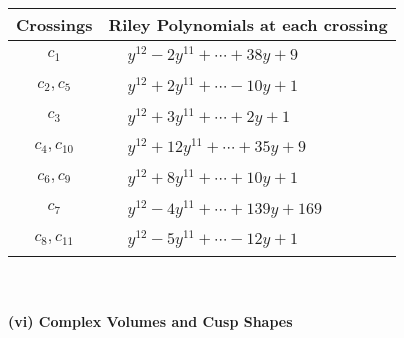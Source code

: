\documentclass[1p]{elsarticle_modified}
\theoremstyle{definition}
\begin{document}
\begin{tabular}{m{50pt}|m{274pt}}
Crossings & \hspace{64pt}Riley Polynomials at each crossing \\
\hline $$\begin{aligned}c_{1}\end{aligned}$$&$\begin{aligned}
&y^{12}-2 y^{11}+\cdots+38 y+9
\end{aligned}$\\
\hline $$\begin{aligned}c_{2},c_{5}\end{aligned}$$&$\begin{aligned}
&y^{12}+2 y^{11}+\cdots-10 y+1
\end{aligned}$\\
\hline $$\begin{aligned}c_{3}\end{aligned}$$&$\begin{aligned}
&y^{12}+3 y^{11}+\cdots+2 y+1
\end{aligned}$\\
\hline $$\begin{aligned}c_{4},c_{10}\end{aligned}$$&$\begin{aligned}
&y^{12}+12 y^{11}+\cdots+35 y+9
\end{aligned}$\\
\hline $$\begin{aligned}c_{6},c_{9}\end{aligned}$$&$\begin{aligned}
&y^{12}+8 y^{11}+\cdots+10 y+1
\end{aligned}$\\
\hline $$\begin{aligned}c_{7}\end{aligned}$$&$\begin{aligned}
&y^{12}-4 y^{11}+\cdots+139 y+169
\end{aligned}$\\
\hline $$\begin{aligned}c_{8},c_{11}\end{aligned}$$&$\begin{aligned}
&y^{12}-5 y^{11}+\cdots-12 y+1
\end{aligned}$\\
\hline
\end{tabular}\\~\\
\newpage\flushleft \textbf{(vi) Complex Volumes and Cusp Shapes}
\end{document}
